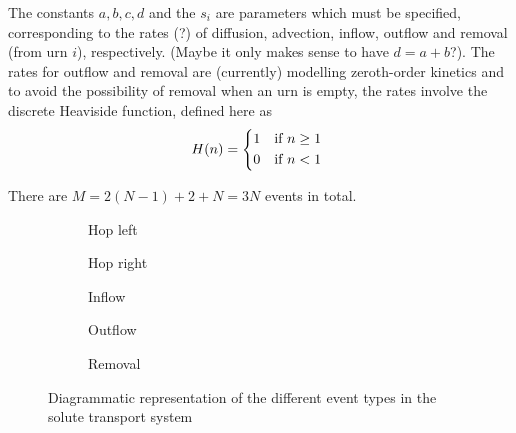 \documentclass[a4paper,11pt]{article}
\numberwithin{equation}{section}
\begin{document}
The constants \(a,b,c,d\) and the \(s_i\) are parameters which must be
specified, corresponding to the rates (?) of diffusion, advection, inflow,
outflow and removal (from urn \(i\)), respectively. (Maybe it only makes sense to have
\(d=a+b\)?). The rates for outflow and removal are (currently) modelling
zeroth-order kinetics and to avoid the possibility of removal when an urn is
empty, the rates involve the discrete Heaviside function, defined
here as
\begin{equation*}
    H(n) =
    \begin{dcases*}
        1 & if \(n \ge 1\)\\
        0 & if \(n < 1\)
    \end{dcases*}
\end{equation*}

There are \(M=2(N-1) + 2 + N = 3N\) events in total.

\begin{figure}[ht!]
    \centering
    \begin{subfigure}[b]{0.3\textwidth}
        \centering
        {
        }
        \caption{Hop left}
    \end{subfigure}
    \qquad\qquad
    \begin{subfigure}[b]{0.3\textwidth}
        \centering
        {
        }
        \caption{Hop right}
    \end{subfigure}

    \begin{subfigure}[b]{0.3\textwidth}
        \centering
        {
        }
        \caption{Inflow}
    \end{subfigure}
    \qquad\qquad
    \begin{subfigure}[b]{0.3\textwidth}
        \centering
        {
        }
        \caption{Outflow}
    \end{subfigure}

    \begin{subfigure}[b]{0.3\textwidth}
        \centering
        {
        }
        \caption{Removal}
    \end{subfigure}
    \caption{\label{fig:transport_events}Diagrammatic representation of the
different event types in the solute transport system}
\end{figure}
\end{document}
